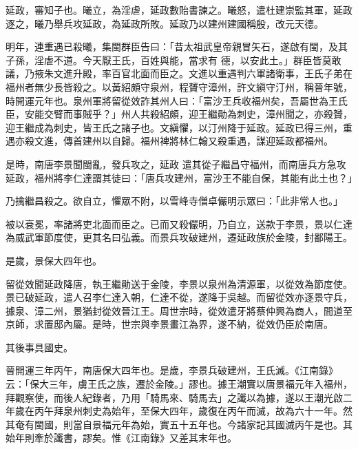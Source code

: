 \begin{pinyinscope}
 延政，審知子也。曦立，為淫虐，延政數貽書諫之。曦怒，遣杜建崇監其軍，延政逐之，曦乃舉兵攻延政，為延政所敗。延政乃以建州建國稱殷，改元天德。



 明年，連重遇已殺曦，集閩群臣告曰：「昔太祖武皇帝親冒矢石，遂啟有閩，及其子孫，淫虐不道。今天厭王氏，百姓與能，當求有
 德，以安此土。」群臣皆莫敢議，乃掖朱文進升殿，率百官北面而臣之。文進以重遇判六軍諸衛事，王氏子弟在福州者無少長皆殺之。以黃紹頗守泉州，程贇守漳州，許文縝守汀州，稱晉年號，時開運元年也。泉州軍將留從效詐其州人曰：「富沙王兵收福州矣，吾屬世為王氏臣，安能交臂而事賊乎？」州人共殺紹頗，迎王繼勛為刺史，漳州聞之，亦殺贇，迎王繼成為刺史，皆王氏之諸子也。文縝懼，以汀州降于延政。延政已得三州，重遇亦殺文進，傳首建州以自歸。福州裨將林仁翰又殺重遇，謀迎延政都福州。



 是時，南唐李景聞閩亂，發兵攻之，延政
 遣其從子繼昌守福州，而南唐兵方急攻延政，福州將李仁達謂其徒曰：「唐兵攻建州，富沙王不能自保，其能有此土也？」



 乃擒繼昌殺之。欲自立，懼眾不附，以雪峰寺僧卓儼明示眾曰：「此非常人也。」



 被以袞冕，率諸將吏北面而臣之。已而又殺儼明，乃自立，送款于李景，景以仁達為威武軍節度使，更其名曰弘義。而景兵攻破建州，遷延政族於金陵，封鄱陽王。



 是歲，景保大四年也。



 留從效聞延政降唐，執王繼勛送于金陵，李景以泉州為清源軍，以從效為節度使。景已破延政，遣人召李仁達入朝，仁達不從，遂降于吳越。而留從效亦逐景守兵，
 據泉、漳二州，景猶封從效晉江王。周世宗時，從效遣牙將蔡仲興為商人，間道至京師，求置邸內屬。是時，世宗與李景畫江為界，遂不納，從效仍臣於南唐。



 其後事具國史。



 晉開運三年丙午，南唐保大四年也。是歲，李景兵破建州，王氏滅。《江南錄》云：「保大三年，虜王氏之族，遷於金陵。」謬也。據王潮實以唐景福元年入福州，拜觀察使，而後人紀錄者，乃用「騎馬來、騎馬去」之讖以為據，遂以王潮光啟二年歲在丙午拜泉州刺史為始年，至保大四年，歲復在丙午而滅，故為六十一年。然其奄有閩國，則當自景福元年為始，實五十五年也。今諸家記其國滅丙午是也。其始年則牽於讖書，謬矣。惟《江南錄》又差其末年也。



\end{pinyinscope}